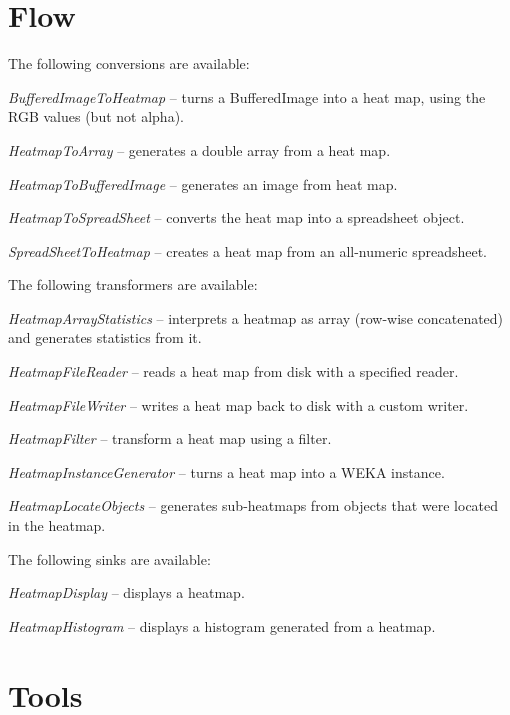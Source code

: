 \documentclass[a4paper]{book}
\begin{document}
\chapter{Flow}
The following conversions are available:
\begin{tight_itemize}
  	\item \textit{BufferedImageToHeatmap} -- turns a BufferedImage into a heat
  	map, using the RGB values (but not alpha).
  	\item \textit{HeatmapToArray} -- generates a double array from a heat map.
  	\item \textit{HeatmapToBufferedImage} -- generates an image from heat map.
  	\item \textit{HeatmapToSpreadSheet} -- converts the heat map into a 
  	spreadsheet object.
  	\item \textit{SpreadSheetToHeatmap} -- creates a heat map from an all-numeric
  	spreadsheet.
\end{tight_itemize}
The following transformers are available:
\begin{tight_itemize}
  	\item \textit{HeatmapArrayStatistics} -- interprets a heatmap as array
  	(row-wise concatenated) and generates statistics from it.
  	\item \textit{HeatmapFileReader} -- reads a heat map from disk with a
  	specified reader.
  	\item \textit{HeatmapFileWriter} -- writes a heat map back to disk with
  	a custom writer.
  	\item \textit{HeatmapFilter} -- transform a heat map using a filter.
  	\item \textit{HeatmapInstanceGenerator} -- turns a heat map into a WEKA
  	instance.
  	\item \textit{HeatmapLocateObjects} -- generates sub-heatmaps from objects
  	that were located in the heatmap.
\end{tight_itemize}
The following sinks are available:
\begin{tight_itemize}
  	\item \textit{HeatmapDisplay} -- displays a heatmap.
  	\item \textit{HeatmapHistogram} -- displays a histogram generated from a heatmap.
\end{tight_itemize}

\chapter{Tools}
\end{document}
